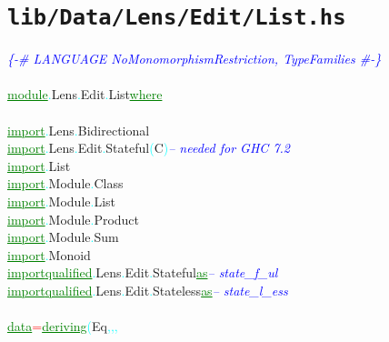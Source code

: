 \section{\texttt{lib/Data/Lens/Edit/List.hs}}
\label{mod:Data.Lens.Edit.List}
\textcolor{blue}{{\it{}\{-\# LANGUAGE NoMonomorphismRestriction, TypeFamilies \#-\}}}\\\\\textcolor{green}{\underline{module}}\textcolor{cyan}{.}{\rm{}Lens}\textcolor{cyan}{.}{\rm{}Edit}\textcolor{cyan}{.}{\rm{}List}\hsspace \textcolor{green}{\underline{where}}\\\\\textcolor{green}{\underline{import}}\textcolor{cyan}{.}{\rm{}Lens}\textcolor{cyan}{.}{\rm{}Bidirectional}\\\textcolor{green}{\underline{import}}\textcolor{cyan}{.}{\rm{}Lens}\textcolor{cyan}{.}{\rm{}Edit}\textcolor{cyan}{.}{\rm{}Stateful}\hsspace \textcolor{cyan}{(}{\rm{}C}\textcolor{cyan}{)}\hsspace \textcolor{blue}{{\it{}-- needed for GHC 7.2}}\\\textcolor{green}{\underline{import}}\textcolor{cyan}{.}{\rm{}List}\\\textcolor{green}{\underline{import}}\textcolor{cyan}{.}{\rm{}Module}\textcolor{cyan}{.}{\rm{}Class}\\\textcolor{green}{\underline{import}}\textcolor{cyan}{.}{\rm{}Module}\textcolor{cyan}{.}{\rm{}List}\\\textcolor{green}{\underline{import}}\textcolor{cyan}{.}{\rm{}Module}\textcolor{cyan}{.}{\rm{}Product}\\\textcolor{green}{\underline{import}}\textcolor{cyan}{.}{\rm{}Module}\textcolor{cyan}{.}{\rm{}Sum}\\\textcolor{green}{\underline{import}}\textcolor{cyan}{.}{\rm{}Monoid}\\\textcolor{green}{\underline{import}}\hsspace \textcolor{green}{\underline{qualified}}\textcolor{cyan}{.}{\rm{}Lens}\textcolor{cyan}{.}{\rm{}Edit}\textcolor{cyan}{.}{\rm{}Stateful}\hsspace \hsspace \textcolor{green}{\underline{as}}\hsspace \textcolor{blue}{{\it{}-- state\_f\_ul}}\\\textcolor{green}{\underline{import}}\hsspace \textcolor{green}{\underline{qualified}}\textcolor{cyan}{.}{\rm{}Lens}\textcolor{cyan}{.}{\rm{}Edit}\textcolor{cyan}{.}{\rm{}Stateless}\hsspace \textcolor{green}{\underline{as}}\hsspace \textcolor{blue}{{\it{}-- state\_l\_ess}}\\\\\textcolor{green}{\underline{data}}\hsspace \textcolor{red}{=}\hsspace \textcolor{green}{\underline{deriving}}\hsspace \textcolor{cyan}{(}{\rm{}Eq}\textcolor{cyan}{,}\textcolor{cyan}{,}\textcolor{cyan}{,}\hsspace 